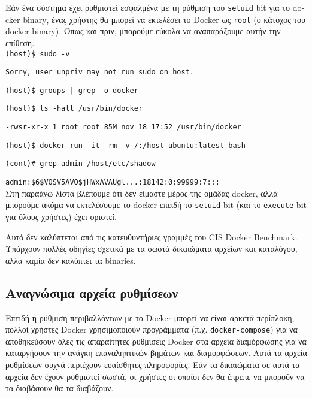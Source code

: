 Εάν ένα σύστημα έχει ρυθμιστεί εσφαλμένα με τη ρύθμιση του
\texttt{\textlatin{setuid}} \textlatin{bit} για το \textlatin{docker binary},
ένας χρήστης θα μπορεί να εκτελέσει το \textlatin{Docker} ως
\texttt{\textlatin{root}} (ο κάτοχος του \textlatin{docker binary}). Όπως και
πριν, μπορούμε εύκολα να αναπαράξουμε αυτήν την επίθεση. \\

\texttt{\textlatin{(host)\$ sudo -v}}

\texttt{\textlatin{Sorry, user unpriv may not run sudo on host.}}

\texttt{\textlatin{(host)\$ groups | grep -o docker}}

\texttt{\textlatin{(host)\$ ls -halt /usr/bin/docker}}

\texttt{\textlatin{-rwsr-xr-x 1 root root 85M nov 18 17:52 /usr/bin/docker}}

\texttt{\textlatin{(host)\$ docker run -it --rm -v /:/host ubuntu:latest bash}}

\texttt{\textlatin{(cont)\# grep admin /host/etc/shadow}}

\texttt{\textlatin{admin:\$6\$VOSV5AVQ\$jHWxAVAUgl...:18142:0:99999:7:::}} \\

Στη παραάνω λίστα βλέπουμε ότι δεν είμαστε μέρος της ομάδας \textlatin{docker},
αλλά μπορούμε ακόμα να εκτελέσουμε το \textlatin{docker} επειδή το
\texttt{\textlatin{setuid}} \textlatin{bit} (και το
\texttt{\textlatin{execute}} \textlatin{bit} για όλους χρήστες) έχει οριστεί.

Αυτό δεν καλύπτεται από τις κατευθυντήριες γραμμές του
\textlatin{CIS Docker Benchmark}. Υπάρχουν πολλές οδηγίες σχετικά με τα σωστά
δικαιώματα αρχείων και καταλόγου, αλλά καμία δεν καλύπτει τα
\textlatin{binaries}.

\subsection{Αναγνώσιμα αρχεία ρυθμίσεων}

Επειδή η ρύθμιση περιβαλλόντων με το \textlatin{Docker} μπορεί να είναι
αρκετά περίπλοκη, πολλοί χρήστες \textlatin{Docker} χρησιμοποιούν προγράμματα
(π.χ. \texttt{\textlatin{docker-compose}}) για να αποθηκεύσουν όλες τις
απαραίτητες ρυθμίσεις \textlatin{Docker} στα αρχεία διαμόρφωσης για να
καταργήσουν την ανάγκη επαναληπτικών βημάτων και διαμορφώσεων. Αυτά τα αρχεία
ρυθμίσεων συχνά περιέχουν ευαίσθητες πληροφορίες. Εάν τα δικαιώματα σε αυτά τα
αρχεία δεν έχουν ρυθμιστεί σωστά, οι χρήστες οι οποίοι δεν θα έπρεπε να μπορούν
να τα διαβάσουν θα τα διαβάζουν.

